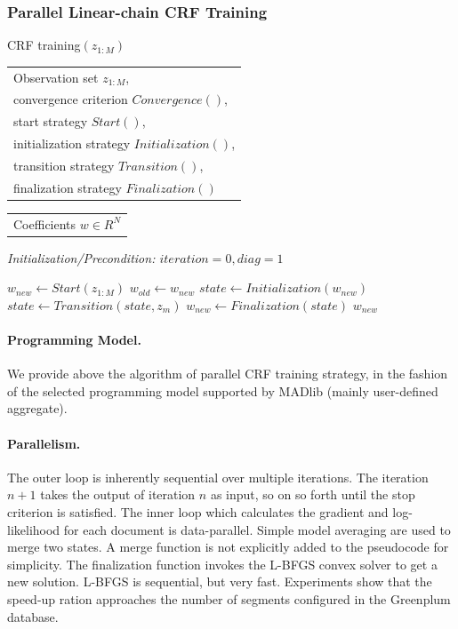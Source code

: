 \documentclass[11pt,letterpaper]{article}
\newlength{\alglabelwidth}
\newcommand{\alginput}[1]{%
\par\noindent%
\settowidth{\alglabelwidth}{\emph{Output:}}%
\makebox[\alglabelwidth][l]{\emph{Input:}} \begin{tabular}[t]{l} #1 \end{tabular}}
\newcommand{\algoutput}[1]{%
\par\noindent%
\settowidth{\alglabelwidth}{\emph{Output:}}%
\makebox[\alglabelwidth][l]{\emph{Output:}} \begin{tabular}[t]{l} #1 \end{tabular}}
\newcommand{\algprecond}[1]{%
\par\noindent\textit{Initialization/Precondition: #1}}
\begin{document}
\subsubsection{Parallel Linear-chain CRF Training}
\begin{algorithm} 
\caption{CRF training$(z_{1:M})$} \label{alg:CRF training}
\alginput{Observation set $z_{1:M}$,\\
convergence criterion $\mathit{Convergence}()$,\\
start strategy $\mathit{Start}()$,\\
initialization strategy $\mathit{Initialization}()$,\\
transition strategy $\mathit{Transition}()$,\\
finalization strategy $\mathit{Finalization}()$}
\algoutput{Coefficients $w \in R^N$}
\algprecond{$iteration = 0, diag = 1$}
\begin{algorithmic}[1]
\State $w_{new} \gets \mathit{Start}(z_{1:M})$
\Repeat
        \State $w_{old} \gets w_{new}$
        \State $\mathit{state} \gets \mathit{Initialization}(w_{new})$
 
\State $\mathit{state} \gets \mathit{Transition}(\mathit{state}, z_m)$
\EndFor
\State $w_{new} \gets Finalization(\mathit{state})$ 
    \State \Return $w_{new}$
\end{algorithmic}
\end{algorithm}

\paragraph{Programming Model.}
We provide above the algorithm of parallel CRF training strategy, in the fashion of the selected programming model supported by MADlib (mainly user-defined aggregate).

\paragraph{Parallelism.}
The outer loop is inherently sequential over multiple iterations.
The iteration $n+1$ takes the output of iteration $n$ as input, so on so forth until the stop criterion is satisfied.
The inner loop which calculates the gradient and log-likelihood for each document is data-parallel.
Simple model averaging are used to merge two states.
A merge function is not explicitly added to the pseudocode for simplicity.
The finalization function invokes the L-BFGS convex solver to get a new solution. L-BFGS is sequential, but very fast.
Experiments show that the speed-up ration approaches the number of segments configured in the Greenplum database.
\end{document}
